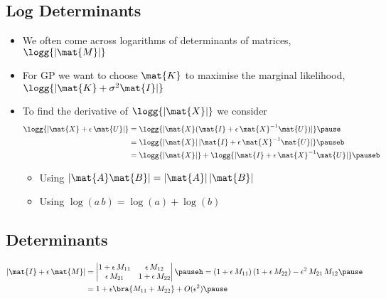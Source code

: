\begin{slide}
  \section[-2]{Log Determinants}

\begin{PauseHighLight}
  \begin{itemize}
  \item We often come across logarithms of determinants of matrices,
    $\logg{|\mat{M}|}$\pause 
  \item For GP we want to choose $\mat{K}$ to maximise the marginal likelihood,
    $\logg{|\mat{K}+\sigma^2\mat{I}|}$\pause 
  \item To find the derivative of $\logg{|\mat{X}|}$ we consider
    \begin{align*}
      \logg{|\mat{X}+\epsilon\,\mat{U}|}
      &= \logg{|\mat{X}(\mat{I} + \epsilon\,\mat{X}^{-1}\mat{U})|}
        \pause\\
      &= \logg{|\mat{X}| \, |\mat{I} + \epsilon\,\mat{X}^{-1}\mat{U}|}
        \pauseb\\
        &= \logg{|\mat{X}|} + \logg{|\mat{I} + \epsilon\,\mat{X}^{-1}\mat{U}|}\pauseb
    \end{align*}{\small
    \begin{itemize}\squeeze
    \item Using $|\mat{A}\mat{B}| = |\mat{A}| \, |\mat{B}|$
      \pause
    \item Using $\log(a\,b) = \log(a) + \log(b)$  \pause
    \end{itemize}}
  \end{itemize}
\end{PauseHighLight}

\end{slide}


\begin{slide}
\section[-2]{Determinants}

\pb \pause
{\small
\begin{align*}
  |\mat{I}+\epsilon\,\mat{M}| &=
  \begin{vmatrix}
    1+\epsilon\, M_{11} & \epsilon\, M_{12}\\
    \epsilon\, M_{21} & 1+\epsilon\, M_{22}
  \end{vmatrix}\pauseh
                        = (1+\epsilon\, M_{11})\,(1+\epsilon\, M_{22}) -
                        \epsilon^2\, M_{21}\,M_{12}\pause \\
  &= 1 + \epsilon \bra{M_{11} + M_{22}} + O(\epsilon^2)\pause
\end{align*}}
\begin{center}
  \pause
\end{center}


\end{slide}


